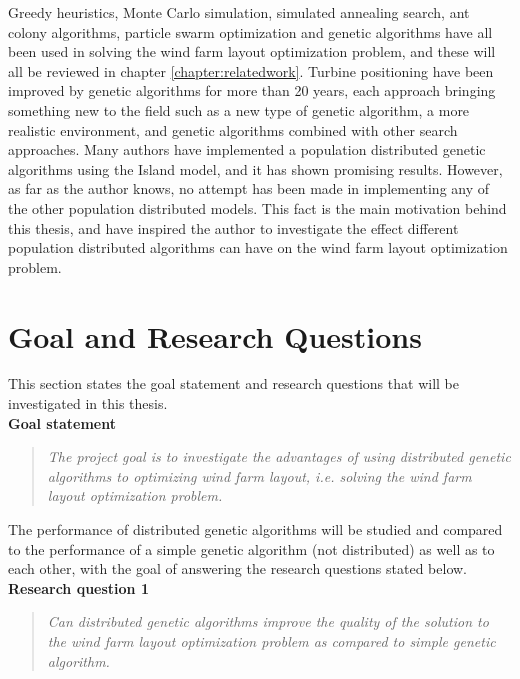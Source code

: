 \noindent Greedy heuristics, Monte Carlo simulation, simulated annealing search, ant colony algorithms, particle swarm optimization and genetic algorithms have all been used in solving the wind farm layout optimization problem, and these will all be reviewed in chapter \ref{chapter:relatedwork}. Turbine positioning have been improved by genetic algorithms for more than 20 years, each approach bringing something new to the field such as a new type of genetic algorithm, a more realistic environment, and genetic algorithms combined with other search approaches. Many authors have implemented a population distributed genetic algorithms using the Island model, and it has shown promising results. However, as far as the author knows, no attempt has been made in implementing any of the other population distributed models. This fact is the main motivation behind this thesis, and have inspired the author to investigate the effect different population distributed algorithms can have on the wind farm layout optimization problem. 


\section{Goal and Research Questions}
This section states the goal statement and research questions that will be investigated in this thesis. \\

\noindent \textbf{Goal statement}

\begin{quote}
\textit{The project goal is to investigate the advantages of using distributed genetic algorithms to optimizing wind farm layout, i.e. solving the wind farm layout optimization problem.} \citep{Samorani}
\end{quote}

\noindent The performance of distributed genetic algorithms will be studied and compared to the performance of a simple genetic algorithm (not distributed) as well as to each other, with the goal of answering the research questions stated below.\\

\noindent \textbf{Research question 1}

\begin{quote}
\textit{Can distributed genetic algorithms improve the quality of the solution to the wind farm layout optimization problem as compared to simple genetic algorithm.}
\end{quote}

